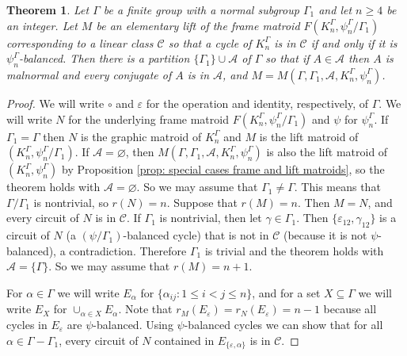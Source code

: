 \documentclass[12pt]{article}
\newtheorem{theorem}{Theorem}[section]
\theoremstyle{definition}
\newcommand{\cA}{\mathcal{A}}
\newcommand{\cC}{\mathcal{C}}
\newcommand{\ep}{\varepsilon}
\begin{document}
\begin{theorem} \label{thm: the converse}
Let $\Gamma$ be a finite group with a normal subgroup $\Gamma_1$ and let $n \ge 4$ be an integer.
Let $M$ be an elementary lift of the frame matroid $F(K_n^{\Gamma}, \psi_n^{\Gamma}/\Gamma_1)$ corresponding to a linear class $\cC$ so that 
a cycle of $K_n^{\Gamma}$ is in $\cC$ if and only if it is $\psi_n^{\Gamma}$-balanced.
Then there is a partition $\{\Gamma_1\} \cup \cA$ of $\Gamma$ so that if $A \in \cA$ then $A$ is malnormal and every conjugate of $A$ is in $\cA$, and $M = M(\Gamma, \Gamma_1, \cA, K_n^{\Gamma}, \psi_n^{\Gamma})$.
\end{theorem}
\begin{proof}
We will write $\circ$ and $\ep$ for the operation and identity, respectively, of $\Gamma$.
We will write $N$ for the underlying frame matroid $F(K_n^{\Gamma}, \psi_n^{\Gamma}/\Gamma_1)$ and $\psi$ for $\psi_n^{\Gamma}$.
If $\Gamma_1 = \Gamma$ then $N$ is the graphic matroid of $K_n^{\Gamma}$ and $M$ is the lift matroid of $(K_n^{\Gamma}, \psi_n^{\Gamma}/\Gamma_1)$.
If $\cA = \varnothing$, then $M(\Gamma, \Gamma_1, \cA, K_n^{\Gamma}, \psi_n^{\Gamma})$ is also the lift matroid of $(K_n^{\Gamma}, \psi_n^{\Gamma})$ by Proposition \ref{prop: special cases frame and lift matroids}, so the theorem holds with $\cA = \varnothing$.
So we may assume that $\Gamma_1 \ne \Gamma$.
This means that $\Gamma/\Gamma_1$ is nontrivial, so $r(N) = n$.
Suppose that $r(M) = n$.
Then $M = N$, and every circuit of $N$ is in $\cC$.
If $\Gamma_1$ is nontrivial, then let $\gamma \in \Gamma_1$.
Then $\{\ep_{12}, \gamma_{12}\}$ is a circuit of $N$ (a $(\psi/\Gamma_1)$-balanced cycle) that is not in $\cC$ (because it is not $\psi$-balanced), a contradiction.
Therefore $\Gamma_1$ is trivial and the theorem holds with $\cA = \{\Gamma\}$.
So we may assume that $r(M) = n + 1$.
 

For $\alpha \in \Gamma$ we will write $E_{\alpha}$ for $\{\alpha_{ij} \colon 1 \le i < j \le n\}$, and for a set $X \subseteq \Gamma$ we will write $E_X$ for $\cup_{\alpha \in X} E_{\alpha}$.
Note that $r_M(E_{\ep}) = r_N(E_{\ep}) = n - 1$ because all cycles in $E_{\ep}$ are $\psi$-balanced.
Using $\psi$-balanced cycles we can show that for all $\alpha \in \Gamma - \Gamma_1$, every circuit of $N$ contained in $E_{\{\ep, \alpha\}}$ is in $\cC$.


\end{proof}
\end{document}
